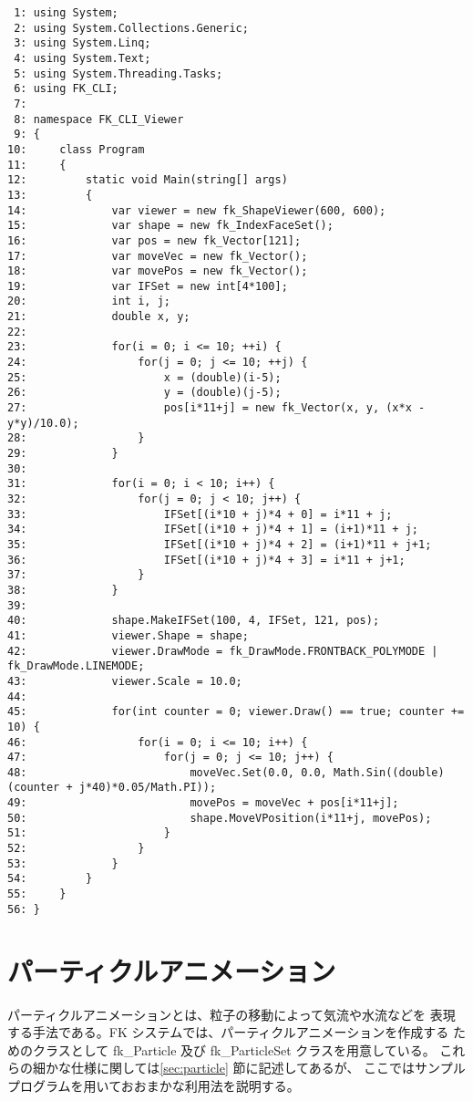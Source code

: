 \begin{breakbox}
\begin{small}
\begin{verbatim}
 1: using System;
 2: using System.Collections.Generic;
 3: using System.Linq;
 4: using System.Text;
 5: using System.Threading.Tasks;
 6: using FK_CLI;
 7: 
 8: namespace FK_CLI_Viewer
 9: {
10:     class Program
11:     {
12:         static void Main(string[] args)
13:         {
14:             var viewer = new fk_ShapeViewer(600, 600);
15:             var shape = new fk_IndexFaceSet();
16:             var pos = new fk_Vector[121];
17:             var moveVec = new fk_Vector();
18:             var movePos = new fk_Vector();
19:             var IFSet = new int[4*100];
20:             int i, j;
21:             double x, y;
22: 
23:             for(i = 0; i <= 10; ++i) {
24:                 for(j = 0; j <= 10; ++j) {
25:                     x = (double)(i-5);
26:                     y = (double)(j-5);
27:                     pos[i*11+j] = new fk_Vector(x, y, (x*x - y*y)/10.0);
28:                 }
29:             }
30: 
31:             for(i = 0; i < 10; i++) {
32:                 for(j = 0; j < 10; j++) {
33:                     IFSet[(i*10 + j)*4 + 0] = i*11 + j;
34:                     IFSet[(i*10 + j)*4 + 1] = (i+1)*11 + j;
35:                     IFSet[(i*10 + j)*4 + 2] = (i+1)*11 + j+1;
36:                     IFSet[(i*10 + j)*4 + 3] = i*11 + j+1;
37:                 }
38:             }
39: 
40:             shape.MakeIFSet(100, 4, IFSet, 121, pos);
41:             viewer.Shape = shape;
42:             viewer.DrawMode = fk_DrawMode.FRONTBACK_POLYMODE | fk_DrawMode.LINEMODE;
43:             viewer.Scale = 10.0;
44: 
45:             for(int counter = 0; viewer.Draw() == true; counter += 10) {
46:                 for(i = 0; i <= 10; i++) {
47:                     for(j = 0; j <= 10; j++) {
48:                         moveVec.Set(0.0, 0.0, Math.Sin((double)(counter + j*40)*0.05/Math.PI));
49:                         movePos = moveVec + pos[i*11+j];
50:                         shape.MoveVPosition(i*11+j, movePos);
51:                     }
52:                 }
53:             }
54:         }
55:     }
56: }
\end{verbatim}
\end{small}
\end{breakbox}

\section{パーティクルアニメーション}
パーティクルアニメーションとは、粒子の移動によって気流や水流などを
表現する手法である。FK システムでは、パーティクルアニメーションを作成する
ためのクラスとして fk\_Particle 及び fk\_ParticleSet クラスを用意している。
これらの細かな仕様に関しては\ref{sec:particle} 節に記述してあるが、
ここではサンプルプログラムを用いておおまかな利用法を説明する。

